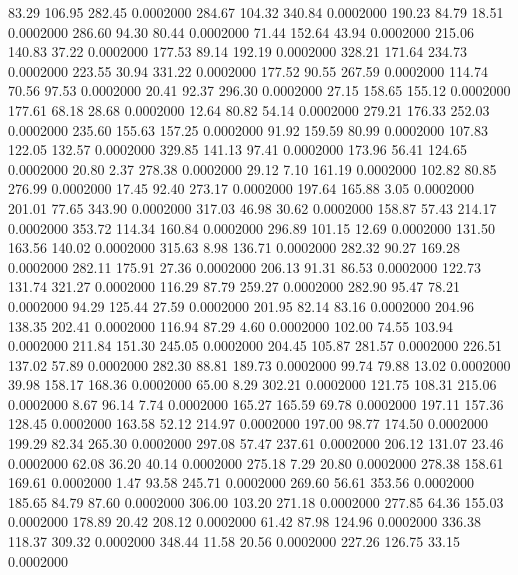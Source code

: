   83.29  106.95  282.45   0.0002000
 284.67  104.32  340.84   0.0002000
 190.23   84.79   18.51   0.0002000
 286.60   94.30   80.44   0.0002000
  71.44  152.64   43.94   0.0002000
 215.06  140.83   37.22   0.0002000
 177.53   89.14  192.19   0.0002000
 328.21  171.64  234.73   0.0002000
 223.55   30.94  331.22   0.0002000
 177.52   90.55  267.59   0.0002000
 114.74   70.56   97.53   0.0002000
  20.41   92.37  296.30   0.0002000
  27.15  158.65  155.12   0.0002000
 177.61   68.18   28.68   0.0002000
  12.64   80.82   54.14   0.0002000
 279.21  176.33  252.03   0.0002000
 235.60  155.63  157.25   0.0002000
  91.92  159.59   80.99   0.0002000
 107.83  122.05  132.57   0.0002000
 329.85  141.13   97.41   0.0002000
 173.96   56.41  124.65   0.0002000
  20.80    2.37  278.38   0.0002000
  29.12    7.10  161.19   0.0002000
 102.82   80.85  276.99   0.0002000
  17.45   92.40  273.17   0.0002000
 197.64  165.88    3.05   0.0002000
 201.01   77.65  343.90   0.0002000
 317.03   46.98   30.62   0.0002000
 158.87   57.43  214.17   0.0002000
 353.72  114.34  160.84   0.0002000
 296.89  101.15   12.69   0.0002000
 131.50  163.56  140.02   0.0002000
 315.63    8.98  136.71   0.0002000
 282.32   90.27  169.28   0.0002000
 282.11  175.91   27.36   0.0002000
 206.13   91.31   86.53   0.0002000
 122.73  131.74  321.27   0.0002000
 116.29   87.79  259.27   0.0002000
 282.90   95.47   78.21   0.0002000
  94.29  125.44   27.59   0.0002000
 201.95   82.14   83.16   0.0002000
 204.96  138.35  202.41   0.0002000
 116.94   87.29    4.60   0.0002000
 102.00   74.55  103.94   0.0002000
 211.84  151.30  245.05   0.0002000
 204.45  105.87  281.57   0.0002000
 226.51  137.02   57.89   0.0002000
 282.30   88.81  189.73   0.0002000
  99.74   79.88   13.02   0.0002000
  39.98  158.17  168.36   0.0002000
  65.00    8.29  302.21   0.0002000
 121.75  108.31  215.06   0.0002000
   8.67   96.14    7.74   0.0002000
 165.27  165.59   69.78   0.0002000
 197.11  157.36  128.45   0.0002000
 163.58   52.12  214.97   0.0002000
 197.00   98.77  174.50   0.0002000
 199.29   82.34  265.30   0.0002000
 297.08   57.47  237.61   0.0002000
 206.12  131.07   23.46   0.0002000
  62.08   36.20   40.14   0.0002000
 275.18    7.29   20.80   0.0002000
 278.38  158.61  169.61   0.0002000
   1.47   93.58  245.71   0.0002000
 269.60   56.61  353.56   0.0002000
 185.65   84.79   87.60   0.0002000
 306.00  103.20  271.18   0.0002000
 277.85   64.36  155.03   0.0002000
 178.89   20.42  208.12   0.0002000
  61.42   87.98  124.96   0.0002000
 336.38  118.37  309.32   0.0002000
 348.44   11.58   20.56   0.0002000
 227.26  126.75   33.15   0.0002000
